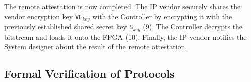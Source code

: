 The remote attestation is now completed. The IP vendor securely shares the vendor encryption key \texttt{VE$_{key}$} with the Controller by encrypting it with the previously established shared secret key \texttt{S$_{key}$} (9). The Controller decrypts the \projecttitle{} bitstream and loads it onto the FPGA (10). 
Finally, the IP vendor notifies the System designer about the result of the remote attestation.
\fi


\subsection{Formal Verification of \projecttitle{} Protocols}
\label{subsec::formal_verification_remote_attestation}

\begingroup
\setlength{\abovedisplayskip}{0.2em}
\setlength{\belowdisplayskip}{0.1em}


